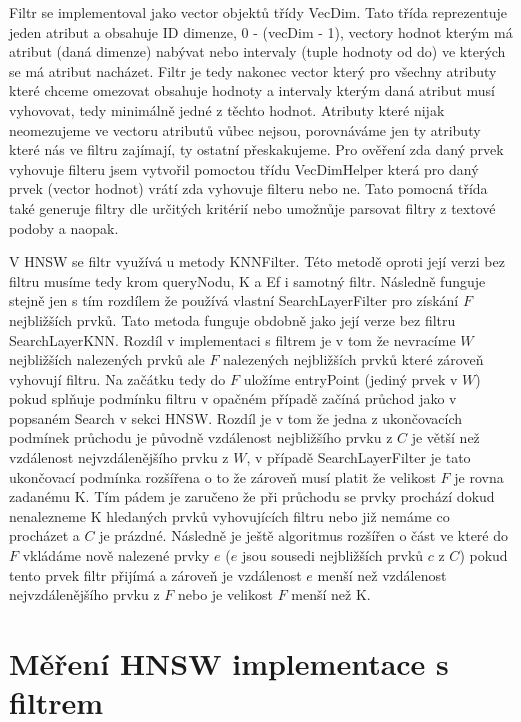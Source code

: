 \documentclass[czech,semestral,dept460,male,csharp,cpdeclaration]{diploma}
\begin{document}
		Filtr se implementoval jako vector objektů třídy VecDim. Tato třída reprezentuje jeden atribut a obsahuje ID dimenze, 0 - (vecDim - 1), vectory hodnot kterým má atribut (daná dimenze) nabývat nebo intervaly (tuple hodnoty od do) ve kterých se má atribut nacházet. Filtr je tedy nakonec vector který pro všechny atributy které chceme omezovat obsahuje hodnoty a intervaly kterým daná atribut musí vyhovovat, tedy minimálně jedné z těchto hodnot. Atributy které nijak neomezujeme ve vectoru atributů vůbec nejsou, porovnáváme jen ty atributy které nás ve filtru zajímají, ty ostatní přeskakujeme. Pro ověření zda daný prvek vyhovuje filteru jsem vytvořil pomoctou třídu VecDimHelper která pro daný prvek (vector hodnot) vrátí zda vyhovuje filteru nebo ne. Tato pomocná třída také generuje filtry dle určitých kritérií nebo umožnůje parsovat filtry z textové podoby a naopak.
		
		V HNSW se filtr využívá u metody KNNFilter. Této metodě oproti její verzi bez filtru musíme tedy krom queryNodu, K a Ef i samotný filtr. Následně funguje stejně jen s tím rozdílem že používá vlastní SearchLayerFilter pro získání $F$ nejbližších prvků. Tato metoda funguje obdobně jako její verze bez filtru SearchLayerKNN. Rozdíl v implementaci s filtrem je v tom že nevracíme $W$ nejbližších nalezených prvků ale $F$ nalezených nejbližších prvků které zároveň vyhovují filtru. Na začátku tedy do $F$ uložíme entryPoint (jediný prvek v $W$) pokud splňuje podmínku filtru v opačném případě začíná průchod jako v popsaném Search v sekci HNSW. Rozdíl je v tom že jedna z ukončovacích podmínek průchodu je původně vzdálenost nejbližšího prvku z $C$ je větší než vzdálenost nejvzdálenějšího prvku z $W$, v případě SearchLayerFilter je tato ukončovací podmínka rozšířena o to že zároveň musí platit že velikost $F$ je rovna zadanému K. Tím pádem je zaručeno že při průchodu se prvky prochází dokud nenalezneme K hledaných prvků vyhovujících filtru nebo již nemáme co procházet a $C$ je prázdné. Následně je ještě algoritmus rozšířen o část ve které do $F$ vkládáme nově nalezené prvky $e$ ($e$ jsou sousedi nejbližších prvků $c$ z $C$) pokud tento prvek filtr přijímá a zároveň je vzdálenost $e$ menší než vzdálenost nejvzdálenějšího prvku z $F$ nebo je velikost $F$ menší než K.
		
		\section{Měření HNSW implementace s filtrem}
		
\end{document}
